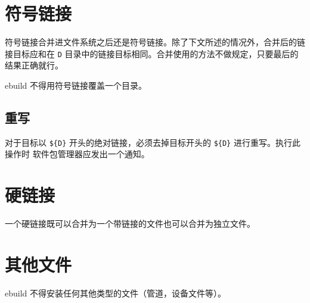 \section{符号链接}

符号链接合并进文件系统之后还是符号链接。除了下文所述的情况外，合并后的链接目标应和在 \texttt{D}
目录中的链接目标相同。合并使用的方法不做规定，只要最后的结果正确就行。

ebuild 不得用符号链接覆盖一个目录。

\subsection{重写}

对于目标以 \texttt{\$\{D\}} 开头的绝对链接，必须去掉目标开头的 \texttt{\$\{D\}} 进行重写。执行此操作时
软件包管理器应发出一个通知。

\section{硬链接}

一个硬链接既可以合并为一个带链接的文件也可以合并为独立文件。

\section{其他文件}

ebuild 不得安装任何其他类型的文件（管道，设备文件等）。


